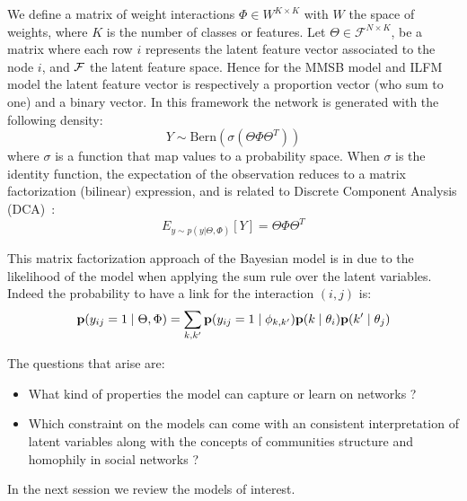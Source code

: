 We define a matrix of weight interactions $\Phi \in W^{K\times K}$ with $W$ the space of weights, where $K$ is the number of classes or features. Let $\Theta \in \mathcal{F}^{N\times K}$, be a matrix where each row $i$ represents the latent feature vector associated to the node $i$,  and $\cal{F}$ the latent feature space. Hence for the MMSB model and ILFM model the latent feature vector is respectively a proportion vector (who sum to one) and a binary vector. In this framework the network is generated with the following density:
\begin{equation} \label{MFDCA}
    Y \sim \mathrm{Bern}(\sigma(\Theta \Phi  \Theta^T))
\end{equation}
where $\sigma$ is a function that map values to a probability space. When $\sigma$ is the identity function, the expectation of the observation reduces to a matrix factorization (bilinear) expression, and is related to Discrete Component Analysis (DCA)~\cite{DCA}:
\begin{equation}
E_{y \sim p(y|\Theta, \Phi)}[Y] = \Theta \Phi  \Theta^T
\end{equation}

This matrix factorization approach of the Bayesian model is in due to the likelihood of the model when applying the sum rule over the latent variables. Indeed the probability to have a link for the interaction $(i,j)$ is:
\begin{equation}
\mathbf{p}(y_{ij}=1 \mid \Theta, \Phi ) = \sum_{k, k'} \mathbf{p}(y_{ij}=1\mid\phi_{k,k'}) \mathbf{p}(k \mid\theta_i) \mathbf{p}(k' \mid \theta_j)
\end{equation}


The questions that arise are:
\begin{itemize}
	\item What kind of properties the model can capture or learn on networks ?
	\item Which constraint on the models can come with an consistent interpretation of latent variables along with the concepts of communities structure and homophily in social networks  ?
\end{itemize} 

In the next session we review the models of interest.

